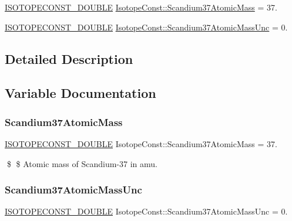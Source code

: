 \begin{DoxyCompactItemize}
\item 
\mbox{\hyperlink{group___isotope_const-_macros_ga8f45a7272ce02c0b4c65c44636ed719a}{I\+S\+O\+T\+O\+P\+E\+C\+O\+N\+S\+T\+\_\+\+D\+O\+U\+B\+LE}} \mbox{\hyperlink{group___isotope_const-_scandium-_sc37_ga63f5f404d15e14ad22dcca43d3c9e99e}{Isotope\+Const\+::\+Scandium37\+Atomic\+Mass}} = 37.
\item 
\mbox{\hyperlink{group___isotope_const-_macros_ga8f45a7272ce02c0b4c65c44636ed719a}{I\+S\+O\+T\+O\+P\+E\+C\+O\+N\+S\+T\+\_\+\+D\+O\+U\+B\+LE}} \mbox{\hyperlink{group___isotope_const-_scandium-_sc37_ga204be6a2cff92f842445359563e513ca}{Isotope\+Const\+::\+Scandium37\+Atomic\+Mass\+Unc}} = 0.
\end{DoxyCompactItemize}


\subsection{Detailed Description}


\subsection{Variable Documentation}
\mbox{\label{group___isotope_const-_scandium-_sc37_ga63f5f404d15e14ad22dcca43d3c9e99e}} 
\subsubsection{\texorpdfstring{Scandium37\+Atomic\+Mass}{Scandium37AtomicMass}}
{\footnotesize\ttfamily \mbox{\hyperlink{group___isotope_const-_macros_ga8f45a7272ce02c0b4c65c44636ed719a}{I\+S\+O\+T\+O\+P\+E\+C\+O\+N\+S\+T\+\_\+\+D\+O\+U\+B\+LE}} Isotope\+Const\+::\+Scandium37\+Atomic\+Mass = 37.}

\$ \$ Atomic mass of Scandium-\/37 in amu. \mbox{\label{group___isotope_const-_scandium-_sc37_ga204be6a2cff92f842445359563e513ca}} 
\subsubsection{\texorpdfstring{Scandium37\+Atomic\+Mass\+Unc}{Scandium37AtomicMassUnc}}
{\footnotesize\ttfamily \mbox{\hyperlink{group___isotope_const-_macros_ga8f45a7272ce02c0b4c65c44636ed719a}{I\+S\+O\+T\+O\+P\+E\+C\+O\+N\+S\+T\+\_\+\+D\+O\+U\+B\+LE}} Isotope\+Const\+::\+Scandium37\+Atomic\+Mass\+Unc = 0.}

